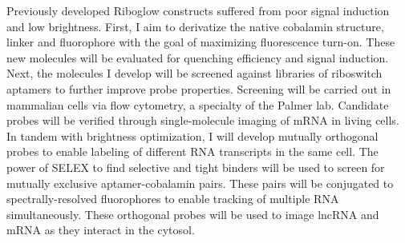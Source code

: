 Previously developed Riboglow constructs suffered from poor signal induction and low brightness. First, I aim to derivatize the native cobalamin structure, linker and fluorophore with the goal of maximizing fluorescence turn-on. These new molecules will be evaluated for quenching efficiency and signal induction. Next, the molecules I develop will be screened against libraries of riboswitch aptamers to further improve probe properties. Screening will be carried out in mammalian cells via flow cytometry, a specialty of the Palmer lab. Candidate probes will be verified through single-molecule imaging of mRNA in living cells. In tandem with brightness optimization, I will develop mutually orthogonal probes to enable labeling of different RNA transcripts in the same cell. The power of SELEX to find selective and tight binders will be used to screen for mutually exclusive aptamer-cobalamin pairs. These pairs will be conjugated to spectrally-resolved fluorophores to enable tracking of multiple RNA simultaneously. These orthogonal probes will be used to image lncRNA and mRNA as they interact in the cytosol.

